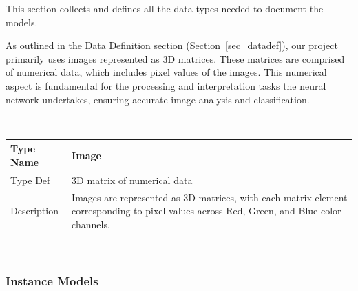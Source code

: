 \documentclass[12pt]{article}
\newcommand{\colAwidth}{0.13\textwidth}
\newcommand{\colBwidth}{0.82\textwidth}
\begin{document}



This section collects and defines all the data types needed to document the
models. 

As outlined in the Data Definition section (Section~\ref{sec_datadef}), our project primarily uses images represented 
as 3D matrices. These matrices are comprised of numerical data, which includes pixel values 
of the images. This 
numerical aspect is fundamental for the processing and interpretation tasks the neural 
network undertakes, ensuring accurate image analysis and classification.

~\newline

\noindent
\begin{minipage}{\textwidth}
\renewcommand*{\arraystretch}{1.5}
\begin{tabular}{| p{\colAwidth} | p{\colBwidth}|}
  \hline
  \rowcolor[gray]{0.9}
  Type Name & Image\\
  \hline
  Type Def & 3D matrix of numerical data\\
  \hline
  Description & Images are represented as 3D matrices, 
  with each matrix element corresponding to pixel values across Red, 
  Green, and Blue color channels. 
  \\
  \hline
\end{tabular}
\end{minipage}\\

\subsubsection{Instance Models} \label{sec_instance}    

\end{document}
